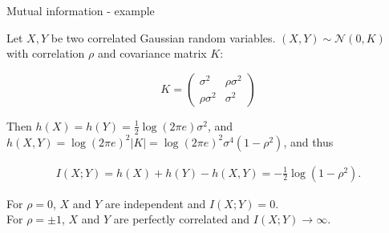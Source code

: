 \documentclass[11pt,compress,t,notes=noshow, xcolor=table]{beamer}
\begin{document}
\begin{vbframe} {Mutual information - example}

Let $X, Y$ be two correlated Gaussian random variables. $(X, Y) \sim \mathcal{N}(0, K)$ with correlation $\rho$ and covariance matrix $K$:

$$
K =
\begin{pmatrix}
  \sigma^2 & \rho \sigma^2 \\
  \rho \sigma^2 & \sigma^2
\end{pmatrix}
$$

Then $h(X) = h(Y) = \frac{1}{2} \log(2 \pi e) \sigma^2$, and $h(X,Y) = \log(2 \pi e)^2 |K| = \log(2 \pi e)^2 \sigma^4 (1 - \rho^2)$, and thus

\begin{equation*}
\begin{aligned}
I(X;Y) = h(X) + h(Y) - h(X,Y) = -  \frac{1}{2} \log(1 - \rho^2).
\end{aligned}
\end{equation*}

For $\rho = 0$, $X$ and $Y$ are independent and $I(X;Y) = 0$. \\
For $\rho = \pm 1$, $X$ and $Y$ are perfectly correlated and $I(X;Y) \rightarrow \infty$. 
\end{vbframe}








\end{document}
